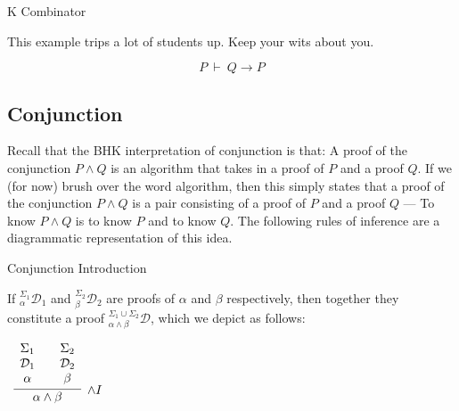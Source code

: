 \documentclass{book}
\begin{document}
    \begin{eg}{K Combinator}
        
        This example trips a lot of students up. Keep your wits about you.

        $$P \ \vdash \ Q \to P$$

    \end{eg}

    \newpage
    \subsection*{Conjunction}

    Recall that the BHK interpretation of conjunction is that: A proof of the conjunction $P \land Q$ is an algorithm that takes in a proof of $P$ and a proof $Q$. If we (for now) brush over the word algorithm, then this simply states that a proof of the conjunction $P \land Q$ is a pair consisting of a proof of $P$ and a proof $Q$ --- To know $P \land Q$ is to know $P$ and to know $Q$. The following rules of inference are a diagrammatic representation of this idea. 

    \vspace{0.1cm}

    {Conjunction Introduction}

        If $^{\Sigma_{1}}_{\alpha}\mathcal{D}_{1}$ and $^{\Sigma_{2}}_{\beta}\mathcal{D}_{2}$ are proofs of $\alpha$ and $\beta$ respectively, then together they constitute a proof $^{\Sigma_{1} \cup \Sigma_{2}}_{\alpha \land \beta}\mathcal{D}$, which we depict as follows: 

        \begin{center}
            $\begin{array}{c}
                \infer[\land I]{\alpha \land \beta}
                    {\begin{array}{c}
                        \Sigma_{1} \\
                        \mathcal{D}_{1} \\
                        \alpha
                    \end{array}
                    &
                    \begin{array}{c}
                        \Sigma_{2} \\
                        \mathcal{D}_{2} \\
                        \beta
                    \end{array}}
            \end{array}$
        \end{center}
    
\end{document}
